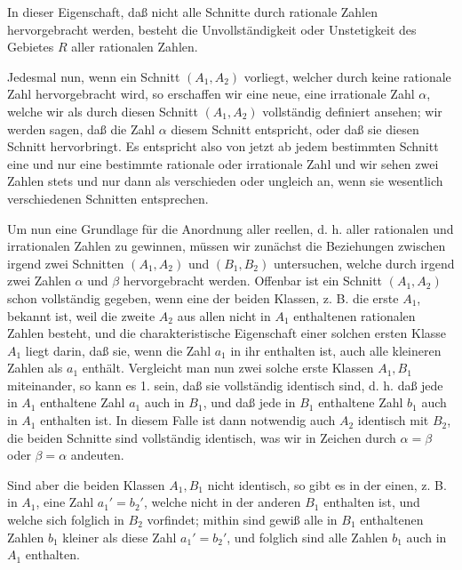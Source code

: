 \documentclass[11pt]{article}
\begin{document}
In dieser Eigenschaft, daß nicht alle Schnitte durch rationale Zahlen hervorgebracht werden, besteht die Unvollständigkeit oder Unstetigkeit des Gebietes $R$ aller rationalen Zahlen.

Jedesmal nun, wenn ein Schnitt $(A_1,A_2)$ vorliegt, welcher durch keine rationale Zahl hervorgebracht wird, so erschaffen wir eine neue, eine irrationale Zahl $\alpha$, welche wir als durch diesen Schnitt $(A_1,A_2)$ vollständig definiert ansehen; wir werden sagen, daß die Zahl $\alpha$ diesem Schnitt entspricht, oder daß sie diesen Schnitt hervorbringt. Es entspricht also von jetzt ab jedem bestimmten Schnitt eine und nur eine bestimmte rationale oder irrationale Zahl und wir sehen zwei Zahlen stets und nur dann als verschieden oder ungleich an, wenn sie wesentlich verschiedenen Schnitten entsprechen.

Um nun eine Grundlage für die Anordnung aller reellen, d. h. aller rationalen und irrationalen Zahlen zu gewinnen, müssen wir zunächst die Beziehungen zwischen irgend zwei Schnitten $(A_1,A_2)$ und $(B_1,B_2)$ untersuchen, welche durch irgend zwei Zahlen $\alpha$ und $\beta$ hervorgebracht werden. Offenbar ist ein Schnitt $(A_1,A_2)$ schon vollständig gegeben, wenn eine der beiden Klassen, z. B. die erste $A_1$, bekannt ist, weil die zweite $A_2$ aus allen nicht in $A_1$ enthaltenen rationalen Zahlen besteht, und die charakteristische Eigenschaft einer solchen ersten Klasse $A_1$ liegt darin, daß sie, wenn die Zahl $a_1$ in ihr enthalten ist, auch alle kleineren Zahlen als $a_1$ enthält. Vergleicht man nun zwei solche erste Klassen $A_1,B_1$ miteinander, so kann es 1. sein, daß sie vollständig identisch sind, d. h. daß jede in $A_1$ enthaltene Zahl $a_1$ auch in $B_1$, und daß jede in $B_1$ enthaltene Zahl $b_1$ auch in $A_1$ enthalten ist. In diesem Falle ist dann notwendig auch $A_2$ identisch mit $B_2$, die beiden Schnitte sind vollständig identisch, was wir in Zeichen durch $\alpha=\beta$ oder $\beta=\alpha$ andeuten.

Sind aber die beiden Klassen $A_1,B_1$ nicht identisch, so gibt es in der einen, z. B. in $A_1$, eine Zahl $a_1'=b_2'$, welche nicht in der anderen $B_1$ enthalten ist, und welche sich folglich in $B_2$ vorfindet; mithin sind gewiß alle in $B_1$ enthaltenen Zahlen $b_1$ kleiner als diese Zahl $a_1'=b_2'$, und folglich sind alle Zahlen $b_1$ auch in $A_1$ enthalten.
\end{document}
